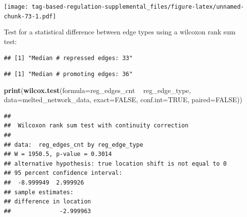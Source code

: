 \documentclass[]{book}
\newenvironment{Shaded}{\begin{snugshade}}{\end{snugshade}}
\newcommand{\DataTypeTok}[1]{\textcolor[rgb]{0.13,0.29,0.53}{#1}}
\newcommand{\KeywordTok}[1]{\textcolor[rgb]{0.13,0.29,0.53}{\textbf{#1}}}
\newcommand{\NormalTok}[1]{#1}
\newcommand{\OperatorTok}[1]{\textcolor[rgb]{0.81,0.36,0.00}{\textbf{#1}}}
\newcommand{\OtherTok}[1]{\textcolor[rgb]{0.56,0.35,0.01}{#1}}
\newcommand{\StringTok}[1]{\textcolor[rgb]{0.31,0.60,0.02}{#1}}
\begin{document}
\texttt{[image: tag-based-regulation-supplemental\_files/figure-latex/unnamed-chunk-73-1.pdf]}

Test for a statistical difference between edge types using a wilcoxon rank sum test:

\begin{Shaded}
\end{Shaded}

\begin{verbatim}
## [1] "Median # repressed edges: 33"
\end{verbatim}

\begin{Shaded}
\end{Shaded}

\begin{verbatim}
## [1] "Median # promoting edges: 36"
\end{verbatim}

\begin{Shaded}
\begin{Highlighting}[]
\KeywordTok{print}\NormalTok{(}\KeywordTok{wilcox.test}\NormalTok{(}\DataTypeTok{formula=}\NormalTok{reg_edges_cnt }\OperatorTok{~}\StringTok{ }\NormalTok{reg_edge_type, }\DataTypeTok{data=}\NormalTok{melted_network_data, }\DataTypeTok{exact=}\OtherTok{FALSE}\NormalTok{, }\DataTypeTok{conf.int=}\OtherTok{TRUE}\NormalTok{, }\DataTypeTok{paired=}\OtherTok{FALSE}\NormalTok{))}
\end{Highlighting}
\end{Shaded}

\begin{verbatim}
## 
##  Wilcoxon rank sum test with continuity correction
## 
## data:  reg_edges_cnt by reg_edge_type
## W = 1950.5, p-value = 0.3014
## alternative hypothesis: true location shift is not equal to 0
## 95 percent confidence interval:
##  -8.999949  2.999926
## sample estimates:
## difference in location 
##              -2.999963
\end{verbatim}
\end{document}
